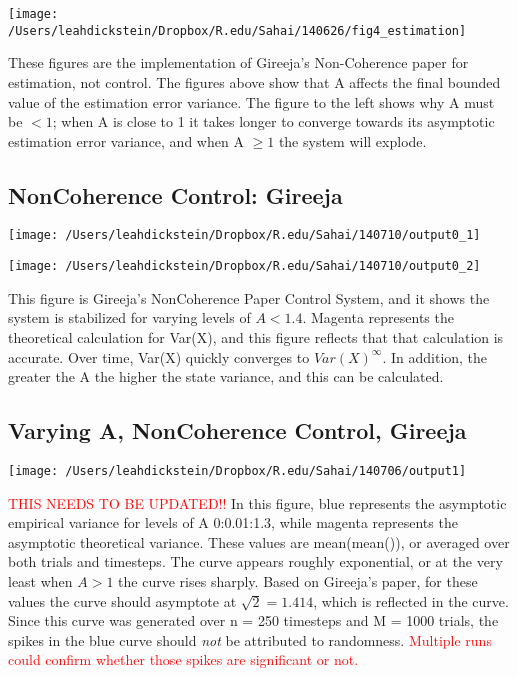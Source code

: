 \documentclass[leqno,twocolumn]{article}
\begin{document}
\begin{minipage}[c]{0.5\textwidth}
\texttt{[image: /Users/leahdickstein/Dropbox/R.edu/Sahai/140626/fig4\_estimation]}
\end{minipage}
\begin{minipage}[b]{0.5\textwidth}
These figures are the implementation of Gireeja's Non-Coherence paper for estimation, not control. The figures above show that A affects the final bounded value of the estimation error variance. The figure to the left shows why A must be $< 1$; when A is close to 1 it takes longer to converge towards its asymptotic estimation error variance, and when A $\geq 1$ the system will explode.
\end{minipage}

\subsection{NonCoherence Control: Gireeja}
\begin{minipage}[c]{0.5\textwidth}
\texttt{[image: /Users/leahdickstein/Dropbox/R.edu/Sahai/140710/output0\_1]}
\end{minipage}
\begin{minipage}[c]{0.5\textwidth}
\texttt{[image: /Users/leahdickstein/Dropbox/R.edu/Sahai/140710/output0\_2]}
\end{minipage}

This figure is Gireeja's NonCoherence Paper Control System, and it shows the system is stabilized for varying levels of $A < 1.4$. Magenta represents the theoretical calculation for Var(X), and this figure reflects that that calculation is accurate. Over time, Var(X) quickly converges to $Var(X)^\infty$. In addition, the greater the A the higher the state variance, and this can be calculated.

\subsection{Varying A, NonCoherence Control, Gireeja}
\begin{minipage}[c]{0.5\textwidth}
\texttt{[image: /Users/leahdickstein/Dropbox/R.edu/Sahai/140706/output1]}
\end{minipage}
\begin{minipage}[b]{0.5\textwidth}
\textcolor{red}{THIS NEEDS TO BE UPDATED!!} In this figure, blue represents the asymptotic empirical variance for levels of A 0:0.01:1.3, while magenta represents the asymptotic theoretical variance. These values are mean(mean()), or averaged over both trials and timesteps. The curve appears roughly exponential, or at the very least when $A > 1$ the curve rises sharply. Based on Gireeja's paper, for these values the curve should asymptote at $\sqrt{2} = 1.414$, which is reflected in the curve. Since this curve was generated over n = 250 timesteps and M = 1000 trials, the spikes in the blue curve should \textit{not} be attributed to randomness. \textcolor{red}{Multiple runs could confirm whether those spikes are significant or not.}
\end{minipage}
\end{document}
